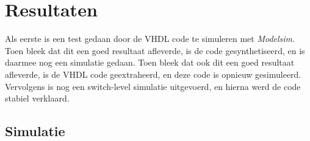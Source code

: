 \section{Resultaten}
Als eerste is een test gedaan door de VHDL code te simuleren met \emph{Modelsim}. Toen bleek dat dit een goed resultaat afleverde, is de code gesynthetiseerd, en is daarmee nog een simulatie gedaan. Toen bleek dat ook dit een goed resultaat afleverde, is de VHDL code geextraheerd, en deze code is opnieuw gesimuleerd. Vervolgens is nog een switch-level simulatie uitgevoerd, en hierna werd de code stabiel verklaard.

\subsection{Simulatie}

